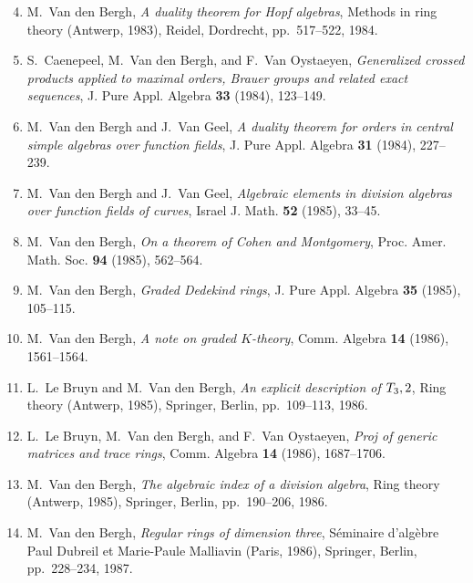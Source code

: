 \begin{enumerate}
\setcounter{enumi}{3}
\item
M.~Van den Bergh, {\em A duality theorem for Hopf algebras}, Methods in ring theory (Antwerp, 1983), Reidel, Dordrecht, pp.~517--522, 1984.

\item
S.~Caenepeel, M.~Van den Bergh, and F.~Van Oystaeyen, {\em Generalized crossed products applied to maximal orders, Brauer groups and related exact sequences}, J. Pure Appl. Algebra {\bf 33} (1984), 123--149.

\item
M.~Van den Bergh and J.~Van Geel, {\em A duality theorem for orders in central simple algebras over function fields}, J. Pure Appl. Algebra {\bf 31} (1984), 227--239.

\item
M.~Van den Bergh and J.~Van Geel, {\em Algebraic elements in division algebras over function fields of curves}, Israel J. Math. {\bf 52} (1985), 33--45.

\item
M.~Van den Bergh, {\em On a theorem of Cohen and Montgomery}, Proc. Amer. Math. Soc. {\bf 94} (1985), 562--564.

\item
M.~Van den Bergh, {\em Graded Dedekind rings}, J. Pure Appl. Algebra {\bf 35} (1985), 105--115.

\item
M.~Van den Bergh, {\em A note on graded $K$-theory}, Comm. Algebra {\bf 14} (1986), 1561--1564.

\item
L.~Le Bruyn and M.~Van den Bergh, {\em An explicit description of $T\sb 3,2$}, Ring theory (Antwerp, 1985), Springer, Berlin, pp.~109--113, 1986.

\item
L.~Le Bruyn, M.~Van den Bergh, and F.~Van Oystaeyen, {\em Proj of generic matrices and trace rings}, Comm. Algebra {\bf 14} (1986), 1687--1706.

\item
M.~Van den Bergh, {\em The algebraic index of a division algebra}, Ring theory (Antwerp, 1985), Springer, Berlin, pp.~190--206, 1986.

\item
M.~Van den Bergh, {\em Regular rings of dimension three}, S\'eminaire d'alg\`ebre Paul Dubreil et Marie-Paule Malliavin (Paris, 1986), Springer, Berlin, pp.~228--234, 1987.


\end{enumerate}
